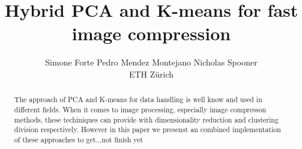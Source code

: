 \documentclass[10pt,conference,compsocconf]{IEEEtran}
\title{Hybrid PCA and K-means for fast image compression}
\author{Simone Forte \qquad Pedro Mendez Montejano \qquad Nicholas Spooner \\
		ETH Z\"urich}
\begin{document}
\maketitle

\begin{abstract}
The approach of PCA and K-means for data handling is well know and used in different fields. When it comes to image processing, especially image compresson methods, these techiniques can provide with dimensionality reduction and clustering division respectively. However in this paper we presenst an combined implementation of these approaches to get...not finish yet
\end{abstract}












\end{document}

